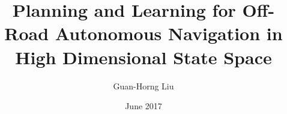 \documentclass[hidelinks, 12pt]{cmuthesis}
\begin{document}
 
\frontmatter

\pagestyle{empty}

\title{ %
{\bf Planning and Learning for Off-Road Autonomous Navigation in High Dimensional State Space}}
\author{Guan-Horng Liu}
\date{June 2017}


\support{}
\disclaimer{}



\maketitle


\pagestyle{plain}
\end{document}
